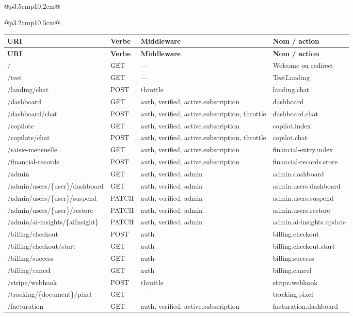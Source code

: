 \documentclass[11pt,a4paper]{report}
\begin{document}
\begin{longtable}{@{}p{3.5cm}p{10.2cm}@{}}
\begin{longtable}{@{}p{3.2cm}p{10.5cm}@{}}
\begingroup
\scriptsize
\begin{longtable}{@{}p{5.8cm}p{1cm}p{2.2cm}p{5.5cm}@{}}
\toprule
\textbf{URI} & \textbf{Verbe} & \textbf{Middleware} & \textbf{Nom / action} \\
\midrule
\endfirsthead
\toprule
\textbf{URI} & \textbf{Verbe} & \textbf{Middleware} & \textbf{Nom / action} \\
\midrule
\endhead
/ & GET & — & Welcome ou redirect \\
/test & GET & — & TestLanding \\
/landing/chat & POST & throttle & landing.chat \\
/dashboard & GET & auth, verified, active.subscription & dashboard \\
/dashboard/chat & POST & auth, verified, active.subscription, throttle & dashboard.chat \\
/copilote & GET & auth, verified, active.subscription & copilot.index \\
/copilote/chat & POST & auth, verified, active.subscription, throttle & copilot.chat \\
/saisie-mensuelle & GET & auth, verified, active.subscription & financial-entry.index \\
/financial-records & POST & auth, verified, active.subscription & financial-records.store \\
/admin & GET & auth, verified, admin & admin.dashboard \\
/admin/users/\{user\}/dashboard & GET & auth, verified, admin & admin.users.dashboard \\
/admin/users/\{user\}/suspend & PATCH & auth, verified, admin & admin.users.suspend \\
/admin/users/\{user\}/restore & PATCH & auth, verified, admin & admin.users.restore \\
/admin/ai-insights/\{aiInsight\} & PATCH & auth, verified, admin & admin.ai-insights.update \\
/billing/checkout & POST & auth & billing.checkout \\
/billing/checkout/start & GET & auth & billing.checkout.start \\
/billing/success & GET & auth & billing.success \\
/billing/cancel & GET & auth & billing.cancel \\
/stripe/webhook & POST & throttle & stripe.webhook \\
/tracking/\{document\}/pixel & GET & — & tracking.pixel \\
/facturation & GET & auth, verified, active.subscription & facturation.dashboard \\

\end{longtable}
\end{longtable}
\end{longtable}
\end{document}
